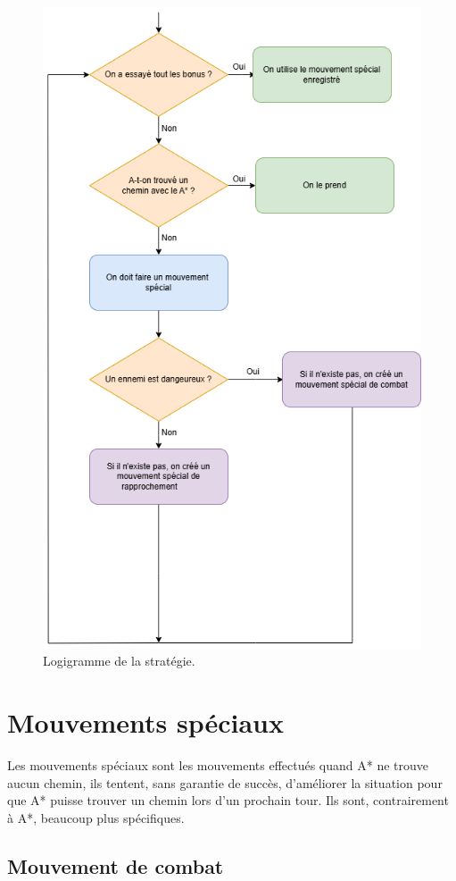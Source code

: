 \begin{figure}[!htpb]
    \centering
    \includegraphics[width=0.75\linewidth]{Figures/diagramme2.png}
    \caption[Logigramme de la stratégie.]{Logigramme de la stratégie.}
    \label{fig:logigramme}
\end{figure}

\section{Mouvements spéciaux}

Les mouvements spéciaux sont les mouvements effectués quand A* ne trouve aucun chemin, ils tentent, sans garantie de succès, d'améliorer la situation pour que A* puisse trouver un chemin lors d'un prochain tour.
\newline
Ils sont, contrairement à A*, beaucoup plus spécifiques.

\subsection{Mouvement de combat}


